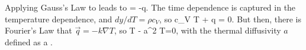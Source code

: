 \documentclass[11pt]{book}
\begin{document}



Applying Gauss's Law to  leads to
\be
{} = -\nabla\cdot \vec q.\ee
The time dependence is captured in the temperature dependence, and $dy/dT = \rho c_V$, so
\be
\rho c_V \dot T + \nabla\cdot \vec q = 0.\ee
But then, there is Fourier's Law that $\vec q = -k \nabla T$, so
\be
\dot T - a\nabla^2 T=0,\ee
with the thermal diffusivity $a$ defined as
\be
a \equiv {} .\ee

%
\end{document}
